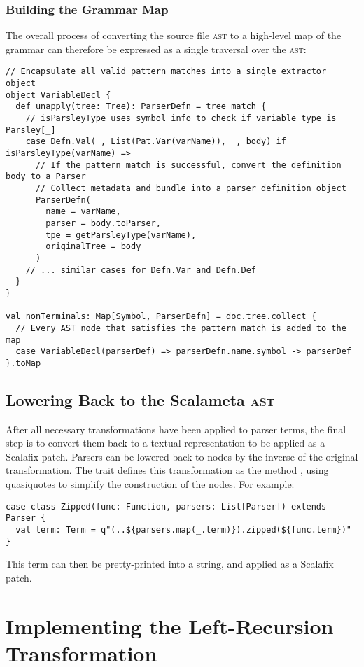 \documentclass[../../main.tex]{subfiles}
\begin{document}
\subsubsection{Building the Grammar Map}
The overall process of converting the source file \textsc{ast} to a high-level map of the grammar can therefore be expressed as a single traversal over the \textsc{ast}:
\begin{verbatim}
// Encapsulate all valid pattern matches into a single extractor object
object VariableDecl {
  def unapply(tree: Tree): ParserDefn = tree match {
    // isParsleyType uses symbol info to check if variable type is Parsley[_]
    case Defn.Val(_, List(Pat.Var(varName)), _, body) if isParsleyType(varName) =>
      // If the pattern match is successful, convert the definition body to a Parser
      // Collect metadata and bundle into a parser definition object
      ParserDefn(
        name = varName,
        parser = body.toParser,
        tpe = getParsleyType(varName),
        originalTree = body
      )
    // ... similar cases for Defn.Var and Defn.Def
  }
}

val nonTerminals: Map[Symbol, ParserDefn] = doc.tree.collect {
  // Every AST node that satisfies the pattern match is added to the map
  case VariableDecl(parserDef) => parserDefn.name.symbol -> parserDef
}.toMap
\end{verbatim}

\subsection{Lowering Back to the Scalameta \textsc{ast}}\label{sec:lowering-parsers}
After all necessary transformations have been applied to parser terms, the final step is to convert them back to a textual representation to be applied as a Scalafix patch.
Parsers can be lowered back to  nodes by the inverse of the original  transformation.
The  trait defines this transformation as the method , using quasiquotes to simplify the construction of the  nodes.
For example:
\begin{verbatim}
case class Zipped(func: Function, parsers: List[Parser]) extends Parser {
  val term: Term = q"(..${parsers.map(_.term)}).zipped(${func.term})"
}
\end{verbatim}
%
This term can then be pretty-printed into a string, and applied as a Scalafix patch.

\section{Implementing the Left-Recursion Transformation}
\end{document}
